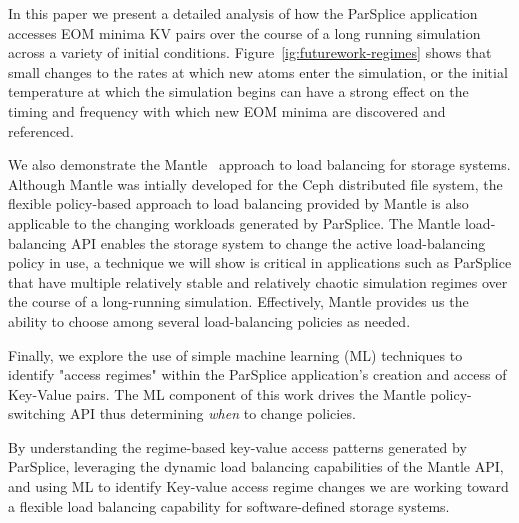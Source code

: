 In this paper we present a detailed analysis of how the ParSplice application
accesses EOM minima KV pairs over the course of a long running simulation
across a variety of initial conditions. Figure~\ref{ig:futurework-regimes}
shows that small changes to the rates at which new atoms enter the simulation,
or the initial temperature at which the simulation begins can have a strong
effect on the timing and frequency with which new EOM minima are discovered and
referenced.

We also demonstrate the Mantle~\cite{sevilla:sc15-mantle} approach to load
balancing for storage systems.  Although Mantle was intially developed for the
Ceph distributed file system, the flexible policy-based approach to load
balancing provided by Mantle is also applicable to the changing workloads
generated by ParSplice. The Mantle load-balancing API enables the storage
system to change the active load-balancing policy in use, a technique we will
show is critical in applications such as ParSplice that have multiple
relatively stable and relatively chaotic simulation regimes over the course of
a long-running simulation. Effectively, Mantle provides us the ability to
choose among several load-balancing policies as needed.

Finally, we explore the use of simple machine learning (ML) techniques to
identify "access regimes" within the ParSplice application's creation and
access of Key-Value pairs. The ML component of this work drives the Mantle
policy-switching API thus determining \emph{when} to change policies.

By understanding the regime-based key-value access patterns generated by
ParSplice, leveraging the dynamic load balancing capabilities of the Mantle
API, and using ML to identify Key-value access regime changes we are working
toward a flexible load balancing capability for software-defined storage
systems. 




